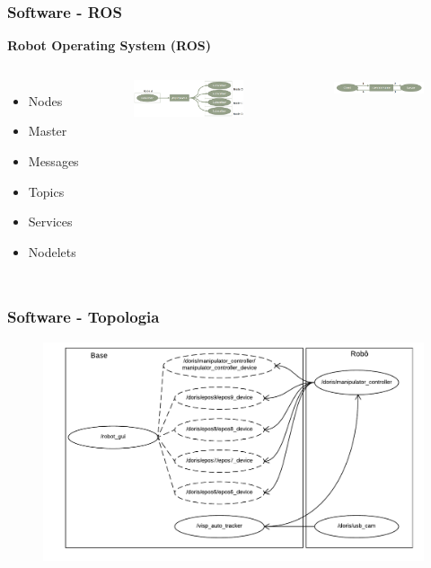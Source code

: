 \documentclass{beamer}
\begin{document}
\begin{frame}
\frametitle{Software - ROS}
\textbf{Robot Operating System (ROS)}
\begin{columns}[c] %

\begin{itemize}
\item Nodes
\item Master
\item Messages
\item Topics
\item Services
\item Nodelets
\end{itemize}

\begin{figure}
  \includegraphics[width=\linewidth]{./img/topics.png}
\end{figure}
\begin{figure}
  \includegraphics[width=\linewidth]{./img/services.png}
\end{figure}
\end{columns}
\end{frame}


\begin{frame}
\frametitle{Software - Topologia}
\begin{figure}
\includegraphics[width=\linewidth]{./img/nodes_simple.pdf}
\end{figure}
\end{frame}
\end{document}
